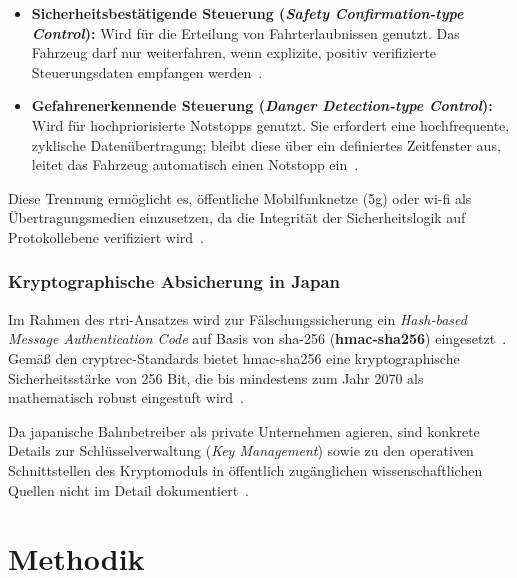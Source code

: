 \documentclass[runningheads]{res/llncs}
\begin{document}
\begin{itemize}
    \item \textbf{Sicherheitsbestätigende Steuerung (\textit{Safety Confirmation-type Control}):} Wird für die Erteilung von Fahrterlaubnissen genutzt. Das Fahrzeug darf nur weiterfahren, wenn explizite, positiv verifizierte Steuerungsdaten empfangen werden~\parencite[S. 10--11]{iwamotoTrain2024}.
    
    \item \textbf{Gefahrenerkennende Steuerung (\textit{Danger Detection-type Control}):} Wird für hochpriorisierte Notstopps genutzt. Sie erfordert eine hochfrequente, zyklische Datenübertragung; bleibt diese über ein definiertes Zeitfenster aus, leitet das Fahrzeug automatisch einen Notstopp ein~\parencite[S. 10--12]{iwamotoTrain2024}.
\end{itemize}

Diese Trennung ermöglicht es, öffentliche Mobilfunknetze (\gls{5g}) oder \gls{wi-fi} als Übertragungsmedien einzusetzen, da die Integrität der Sicherheitslogik auf Protokollebene verifiziert wird~\parencite[S. 3, 10]{iwamotoTrain2024}.

\subsubsection{Kryptographische Absicherung in Japan}
\label{sec:Kryptographische_Absicherung_in_Japan}
Im Rahmen des \gls{rtri}-Ansatzes wird zur Fälschungssicherung 
ein \textit{Hash-based Message Authentication Code} auf Basis von \gls{sha-256} (\textbf{\gls{hmac-sha256}}) eingesetzt~\parencite[S. 12]{iwamotoTrain2024}. Gemäß den \gls{cryptrec}-Standards bietet \gls{hmac-sha256} eine kryptographische Sicherheitsstärke von 256 Bit, die bis mindestens zum Jahr 2070 als mathematisch robust eingestuft wird~\parencite[S. 12]{iwamotoTrain2024}. 

Da japanische Bahnbetreiber als private Unternehmen agieren, sind konkrete Details zur Schlüsselverwaltung (\textit{Key Management}) sowie zu den operativen Schnittstellen des Kryptomoduls in öffentlich zugänglichen wissenschaftlichen Quellen nicht im Detail dokumentiert~\parencite[S. 47]{yanaseJapanese2011}.


\section{Methodik}
\label{sec:Methodik}
\end{document}
